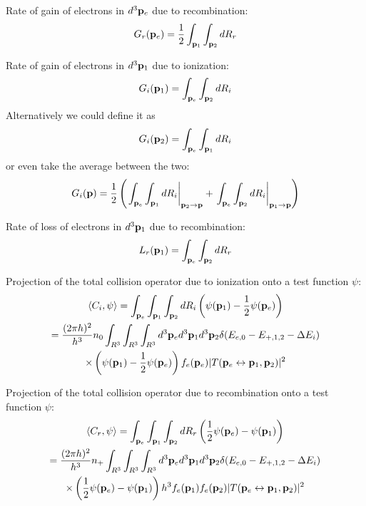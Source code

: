 \documentclass{article}[draft]
\begin{document}
Rate of gain of electrons in $d^3 \mathbf{p}_e$ due to recombination:
\begin{align*}
G_r\of{\vect{p}_e} = \frac{1}{2} \int_{\vect{p}_1} \int_{\vect{p}_2} d R_r
\end{align*}

Rate of gain of electrons in $d^3 \mathbf{p}_1$ due to ionization:
\begin{align*}
G_i\of{\vect{p}_1} = \int_{\vect{p}_e} \int_{\vect{p}_2} d R_i
\end{align*}
Alternatively we could define it as
\begin{align*}
G_i\of{\vect{p}_2} = \int_{\vect{p}_e} \int_{\vect{p}_1} d R_i
\end{align*} 
or even take the average between the two:
\begin{align*}
G_i\of{\vect{p}} = 
\frac12\left( 
\left. \int_{\vect{p}_e} \int_{\vect{p}_1} d R_i \right|_{\vect{p}_2 \rightarrow \vect{p}}
+
\left. \int_{\vect{p}_e} \int_{\vect{p}_2} d R_i \right|_{\vect{p}_1 \rightarrow \vect{p}}
\right)
\end{align*} 

Rate of loss of electrons in $d^3 \mathbf{p}_1$ due to recombination:
\begin{align*}
L_r\of{\vect{p}_1} = \int_{\vect{p}_e} \int_{\vect{p}_2} d R_r
\end{align*}

Projection of the total collision operator due to ionization onto a test function $\psi$:
\begin{multline*}
\left< C_i, \psi \right> = 
\int_{\vect{p}_e} \int_{\vect{p}_1} \int_{\vect{p}_2} 
d R_i \left( \psi\of{\vect{p}_1}  
- \frac12 \psi\of{\vect{p}_e} \right)
\\
= \frac{(2\pi h)^2}{h^3}
n_0
\int_{R^3} 
\int_{R^3} \int_{R^3} 
d^3 \vect{p}_e
d^3 \vect{p}_1 d^3 \vect{p}_2 
\delta\of{E_{e,0} - E_{+,1,2} - \Delta E_i}
\\
\times
\left( \psi\of{\vect{p}_1}  
- \frac12 \psi\of{\vect{p}_e} \right) f_e\of{\vect{p}_e} 
| T\of{\vect{p}_e \leftrightarrow \vect{p}_1, \vect{p}_2} |^2
\end{multline*}

Projection of the total collision operator due to recombination onto a test function $\psi$:
\begin{multline*}
\left< C_r, \psi \right> = 
\int_{\vect{p}_e} \int_{\vect{p}_1} \int_{\vect{p}_2} 
d R_r \left( \frac12 \psi\of{\vect{p}_e} 
- \psi\of{\vect{p}_1} \right) 
\\
= \frac{(2\pi h)^2}{h^3} n_{+}
\int_{R^3} \int_{R^3} \int_{R^3} 
d^3 \vect{p}_e
d^3 \vect{p}_1 d^3 \vect{p}_2 
\delta\of{E_{e,0} - E_{+,1,2} - \Delta E_i}
\\
\times
\left( \frac12 \psi\of{\vect{p}_e}
- \psi\of{\vect{p}_1} \right) h^3 f_e\of{\vect{p}_1}  f_e\of{\vect{p}_2} 
| T\of{\vect{p}_e \leftrightarrow \vect{p}_1, \vect{p}_2} |^2
\end{multline*}
\end{document}
